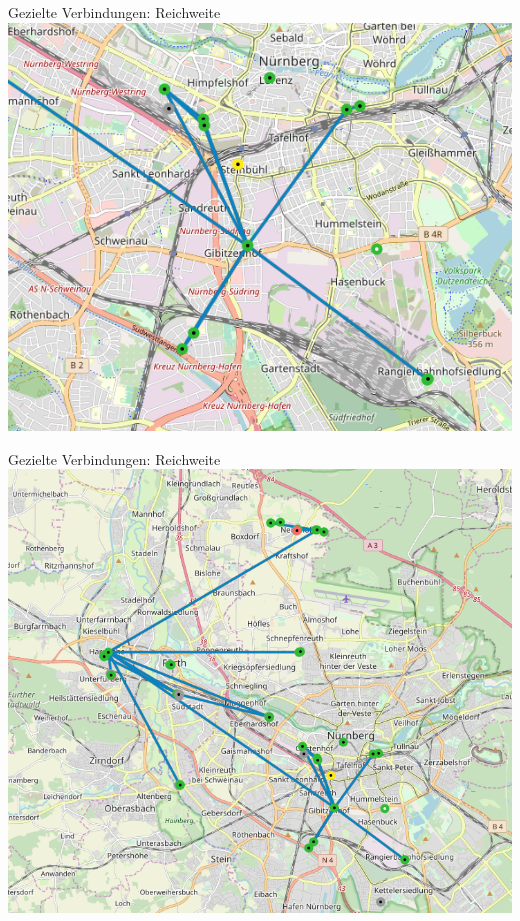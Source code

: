 \documentclass{beamer}
\begin{document}
	\begin{frame}[standout]{Gezielte Verbindungen: Reichweite}
		\includegraphics[height=\textheight]{media/rf_nbg.png}
	\end{frame}
	\begin{frame}[standout]{Gezielte Verbindungen: Reichweite}
		\includegraphics[height=\textheight]{media/rf_nbgfue.png}
	\end{frame}
\end{document}
